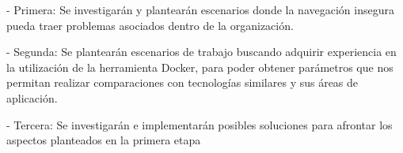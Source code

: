 -	Primera: Se investigarán y plantearán escenarios donde la navegación insegura pueda traer problemas asociados dentro de la organización. 

-	Segunda: Se plantearán escenarios de trabajo buscando adquirir experiencia en la utilización de la herramienta Docker, para poder obtener parámetros que nos permitan realizar comparaciones con tecnologías similares y sus áreas de aplicación.

-	Tercera: Se investigarán e implementarán posibles soluciones para afrontar los 
aspectos planteados en la primera etapa 



